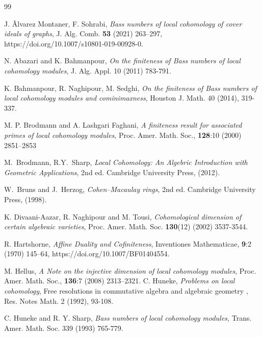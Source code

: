 \documentclass[12pt,twoside, final]{amsart}
\numberwithin{equation}{section}
\newtheorem{nota rem}[thm]{Notation and Remark}
\newtheorem{defen rem}[thm]{Definition and Remark}
\begin{document}
\begin{thebibliography}{99}%


J. Ãlvarez Montaner, F. Sohrabi,  {\em Bass numbers of local cohomology of cover ideals of graphs}, J. Alg. Comb. {\bf53} (2021)  263–297, https://doi.org/10.1007/s10801-019-00928-0.

N. Abazari and K. Bahmanpour, {\em On the ﬁniteness of Bass numbers of local cohomology modules}, J.
Alg. Appl. 10 (2011)  783-791.

	K. Bahmanpour, R. Naghipour, M. Sedghi, {\em
On the finiteness of Bass numbers of local cohomology modules and cominimaxness},
Houston J. Math. 40 (2014), 319-337.

M. P. Brodmann and A. Lashgari Faghani, {\em A finiteness result for associated primes of
local cohomology modules}, Proc.  
Amer. Math. Soc.,
{\bf128}:10 (2000) 2851–2853

M.\ Brodmann,  R.Y.\ Sharp, {\em Local Cohomology: An Algebric
Introduction with Geometric Applications}, 2nd ed. Cambridge University Press, (2012).

W.\ Bruns and J.\ Herzog, {\em Cohen--Macaulay rings}, 2nd ed. Cambridge University Press, (1998).

 
K. Divaani-Aazar, R. Naghipour and M. Tousi, {\em Cohomological dimension of
certain algebraic varieties}, Proc. Amer. Math. Soc.
{\bf 130}(12) (2002) 3537-3544.

R. Hartshorne, {\em Affine Duality and Coﬁniteness}, Inventiones Mathematicae, {\bf 9}:2
 (1970) 145–64,  https://doi.org/10.1007/BF01404554.

 M. Hellus,  {\em A Note on the injective dimension
of local cohomology modules}, Proc. Amer. Math. Soc.,   \textbf{136}:7  (2008) 2313–2321.
C. Huneke, {\em Problems on local cohomology}, Free resolutions in commutative algebra and algebraic
geometry , Res. Notes Math. 2 (1992), 93-108.

 C. Huneke and R. Y. Sharp, {\em Bass numbers of local cohomology modules,} Trans. Amer. Math. Soc. 339 (1993) 765-779.


\end{thebibliography}
\end{document}
